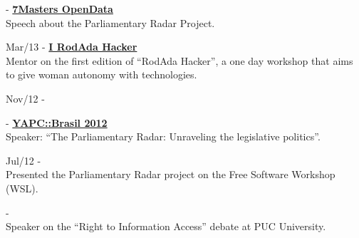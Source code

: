 \documentclass[]{friggeri-cv}
\begin{document}
{\footnotesize{}} - \href{https://setemasters.imasters.com.br/edicoes/opendata/}{\textbf{7Masters OpenData}}\\
           {Speech about the Parliamentary Radar Project}.

{\footnotesize{Mar/13}} - \href{http://rodadahacker.com/}{\textbf{I RodAda Hacker}}\\
%
           {Mentor on the first edition of ``RodAda Hacker'', a one day workshop that aims to give woman autonomy with technologies}.

{\footnotesize{Nov/12}} - \href{http://hackshackers.com/blog/author/gfaleiros/}{\textbf{}}

{\footnotesize{}} - \href{http://yapcbrasil.org.br/2012/talk/110}{\textbf{YAPC::Brasil 2012}}\\
%
           {Speaker: ``The Parliamentary Radar: Unraveling the legislative politics''}.

{\footnotesize{Jul/12}} - \href{http://softwarelivre.org/fisl13}{\textbf{}}\\
           {Presented the Parliamentary Radar project on the Free Software Workshop (WSL)}.

{\footnotesize{}} - \href{http://artigo19.org/infoedireitoseu/?p=560}{\textbf{}}\\
%
           {Speaker on the ``Right to Information Access'' debate at PUC University}.
\end{document}

